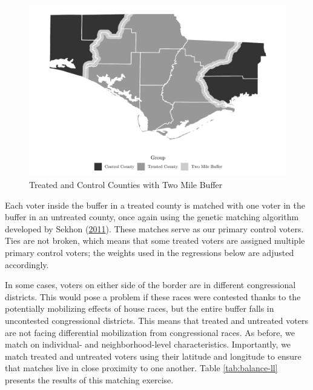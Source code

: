 \documentclass[
  12pt,
]{article}
\begin{document}
\begin{figure}[H]

{\centering \includegraphics{hurricane_michael_files/figure-latex/map-chunk-1} 

}

\caption{\label{fig:map}Treated and Control Counties with Two Mile Buffer}\label{fig:map-chunk}
\end{figure}

Each voter inside the buffer in a treated county is matched with one voter in the buffer in an untreated county, once again using the genetic matching algorithm developed by Sekhon (\protect\hyperlink{ref-Sekhon2011}{2011}). These matches serve as our primary control voters. Ties are not broken, which means that some treated voters are assigned multiple primary control voters; the weights used in the regressions below are adjusted accordingly.

In some cases, voters on either side of the border are in different congressional districts. This would pose a problem if these races were contested thanks to the potentially mobilizing effects of house races, but the entire buffer falls in uncontested congressional districts. This means that treated and untreated voters are not facing differential mobilization from congressional races. As before, we match on individual- and neighborhood-level characteristics. Importantly, we match treated and untreated voters using their latitude and longitude to ensure that matches live in close proximity to one another. Table \ref{tab:balance-ll} presents the results of this matching exercise.
\end{document}
